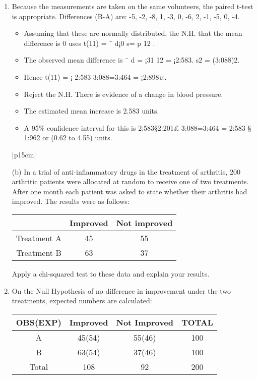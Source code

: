 \documentclass[a4paper,12pt]{article}
\begin{document}
\begin{enumerate}
\item Because the measurements are taken on the same volunteers, the paired t-test is appropriate.
Differences (B-A) are: -5, -2, -8, 1, -3, 0, -6, 2, -1, -5, 0, -4.
\begin{itemize}
\item Assuming that these are normally distributed, the N.H. that the mean difference is 0
uses t(11) = ¯ d¡0
s=
p
12
.
\item The observed mean difference is ¯ d = ¡31
12 = ¡2:583. s2 = (3:088)2.
\item Hence t(11) = ¡ 2:583
3:088=3:464 = ¡2:898¤.

    \item Reject the N.H. There is evidence of a change in blood pressure.
\item The estimated mean increase is 2.583 units. 
\item A 95\% confidence interval for this is 2:583§2:201£
3:088=3:464 = 2:583 § 1:962 or (0.62 to 4.55) units.
\end{itemize}
\newpage
\begin{table}[ht!]
 
\centering
 
\begin{tabular}{|p{15cm}|}
 
\hline  

(b) In a trial of anti-inflammatory drugs in the treatment of arthritis, 200 arthritic patients were allocated at random to receive one of two treatments.  After one month each patient was asked to state whether their arthritis had improved.  The results were as follows:
\begin{center}
\begin{tabular}{|c|c|c|}
 & Improved  &          Not improved \\ \hline
Treatment A   &   45 &  55 \\ \hline
Treatment B &     63 &  37\\ \hline
\end{tabular}
\end{center}
Apply a chi-squared test to these data and explain your results.
\\ \hline
  
\end{tabular}

\end{table}
\item On the Null Hypothesis of no difference in improvement under the two treatments, expected
numbers are calculated:
\begin{center}
\begin{tabular}{|c|c|c|c|}
OBS(EXP) & Improved & Not Improved&  TOTAL\\ \hline
A & 45(54) & 55(46) & 100\\ \hline
B & 63(54) & 37(46) & 100\\ \hline
Total & 108 & 92 & 200\\ \hline
\end{tabular}
\end{center}


\end{enumerate}
\end{document}
